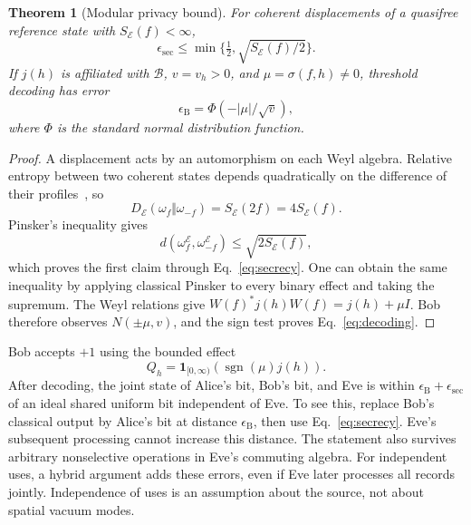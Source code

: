 \documentclass[11pt,a4paper]{article}
\newtheorem{theorem}{Theorem}
\newcommand{\E}{\mathcal E}
\newcommand{\B}{\mathcal B}
\newcommand{\ssec}{\epsilon_{\mathrm{sec}}}
\newcommand{\eB}{\epsilon_{\mathrm B}}
\begin{document}
\begin{theorem}[Modular privacy bound]
\label{thm:privacy}
For coherent displacements of a quasifree reference state with
$S_{\E}(f)<\infty$,
\begin{equation}
\ssec\le\min\{\tfrac12,\sqrt{S_{\E}(f)/2}\}.
\label{eq:privacy}
\end{equation}
If $j(h)$ is affiliated with $\B$, $v=v_h>0$, and
$\mu=\sigma(f,h)\ne0$, threshold decoding has error
\begin{equation}
\eB=\Phi(-|\mu|/\sqrt v),
\label{eq:decoding}
\end{equation}
where $\Phi$ is the standard normal distribution function.
\end{theorem}

\begin{proof}
A displacement acts by an automorphism on each Weyl algebra.
Relative entropy between two coherent states depends quadratically on the
difference of their profiles~\cite{bostelmann2022relative}, so
\begin{equation}
D_{\E}(\omega_f\Vert\omega_{-f})=S_{\E}(2f)=4S_{\E}(f).
\end{equation}
Pinsker's inequality gives
\begin{equation*}
d(\omega_f^{\E},\omega_{-f}^{\E})\le\sqrt{2S_{\E}(f)},
\end{equation*}
which proves the first claim through Eq.~\eqref{eq:secrecy}. One can obtain the same
inequality by applying classical Pinsker to every binary effect and taking
the supremum. The Weyl relations give
$W(f)^*j(h)W(f)=j(h)+\mu I$. Bob therefore observes $N(\pm\mu,v)$,
and the sign test proves Eq.~\eqref{eq:decoding}.
\end{proof}

Bob accepts $+1$ using the bounded effect
\begin{equation*}
Q_h=\mathbf1_{[0,\infty)}(\operatorname{sgn}(\mu)j(h)).
\end{equation*}
After decoding, the joint state of Alice's bit, Bob's bit, and Eve is within
$\eB+\ssec$ of an ideal shared uniform bit independent of Eve. To see this,
replace Bob's classical output by Alice's bit at distance $\eB$, then use
Eq.~\eqref{eq:secrecy}. Eve's subsequent processing cannot increase this
distance. The statement also survives arbitrary nonselective operations
in Eve's commuting algebra. For independent uses, a hybrid argument adds
these errors, even if Eve later processes all records jointly. Independence
of uses is an assumption about the source, not about spatial vacuum modes.
\end{document}
